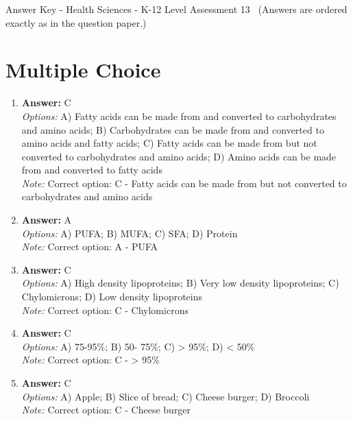 \documentclass[12pt]{article}
\begin{document}
\begin{center}
Answer Key - Health Sciences - K-12 Level Assessment 13 \
\small (Answers are ordered exactly as in the question paper.)
\end{center}

\section*{Multiple Choice}
\begin{enumerate}[label=\arabic*.]
\item \textbf{Answer:} C
\\ \textit{Options:} A) Fatty acids can be made from and converted to carbohydrates and amino acids; B) Carbohydrates can be made from and converted to amino acids and fatty acids; C) Fatty acids can be made from but not converted to carbohydrates and amino acids; D) Amino acids can be made from and converted to fatty acids
\\ \textit{Note:} Correct option: C - Fatty acids can be made from but not converted to carbohydrates and amino acids
\item \textbf{Answer:} A
\\ \textit{Options:} A) PUFA; B) MUFA; C) SFA; D) Protein
\\ \textit{Note:} Correct option: A - PUFA
\item \textbf{Answer:} C
\\ \textit{Options:} A) High density lipoproteins; B) Very low density lipoproteins; C) Chylomicrons; D) Low density lipoproteins
\\ \textit{Note:} Correct option: C - Chylomicrons
\item \textbf{Answer:} C
\\ \textit{Options:} A) 75-95\%; B) 50- 75\%; C) \textgreater{} 95\%; D) \textless{} 50\%
\\ \textit{Note:} Correct option: C - \textgreater{} 95\%
\item \textbf{Answer:} C
\\ \textit{Options:} A) Apple; B) Slice of bread; C) Cheese burger; D) Broccoli
\\ \textit{Note:} Correct option: C - Cheese burger
\end{enumerate}
\end{document}
